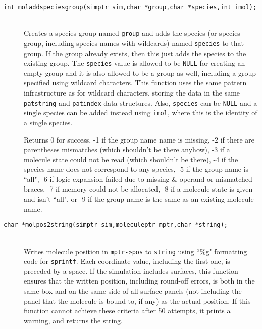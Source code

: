 \documentclass {book}
\begin{document}
\begin{description}
\item[\texttt{int moladdspeciesgroup(simptr sim,char *group,char *species,int imol);}]
\hfill \\
Creates a species group named \texttt{group} and adds the species (or species group, including species names with wildcards) named \texttt{species} to that group.  If the group already exists, then this just adds the species to the existing group.  The \texttt{species} value is allowed to be \texttt{NULL} for creating an empty group and it is also allowed to be a group as well, including a group specified using wildcard characters.  This function uses the same pattern infrastructure as for wildcard characters, storing the data in the same \texttt{patstring} and \texttt{patindex} data structures.  Also, \texttt{species} can be \texttt{NULL} and a single species can be added instead using \texttt{imol}, where this is the identity of a single species.

Returns 0 for success, -1 if the group name name is missing, -2 if there are parentheses mismatches (which shouldn't be there anyhow), -3 if a molecule state could not be read (which shouldn't be there), -4 if the species name does not correspond to any species, -5 if the group name is ``all", -6 if logic expansion failed due to missing \& operand or mismatched braces, -7 if memory could not be allocated, -8 if a molecule state is given and isn't ``all", or -9 if the group name is the same as an existing molecule name.

\item[\texttt{char *molpos2string(simptr sim,moleculeptr mptr,char *string);}]
\hfill \\
Writes molecule position in \texttt{mptr->pos} to \texttt{string} using ``\%g" formatting code for \texttt{sprintf}.  Each coordinate value, including the first one, is preceded by a space.  If the simulation includes surfaces, this function ensures that the written position, including round-off errors, is both in the same box and on the same side of all surface panels (not including the panel that the molecule is bound to, if any) as the actual position.  If this function cannot achieve these criteria after 50 attempts, it prints a warning, and returns the string.


\end{description}
\end{document}
